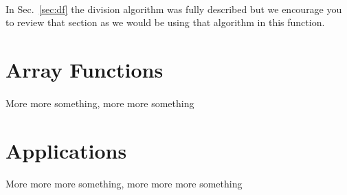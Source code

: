 \documentclass{article}
\begin{document}
		\paragraph{}
		In Sec.~\ref{sec:df} the division algorithm was fully described but we encourage you to review that section as we would be using that algorithm in this function.

	\section{Array Functions}
	\paragraph{}
	More more something, more more something

	\section{Applications}
	\paragraph{}
	More more more something, more more more something

\end{document}
